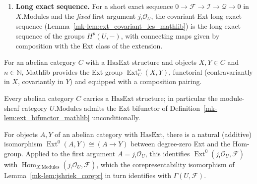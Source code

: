 \begin{definition}
\begin{enumerate}
    \(\operatorname{Ext}^{n+1}(-, \mathcal{I}) = 0\) by
    Lemma~\ref{mk-lem:ext_eq_zero_of_injective_mathlib}. Since \(\mathcal{I}\) is exactly
    the second argument of \(\operatorname{Ext}^{n+1}(j_!\mathcal{O}_U, \mathcal{I})\),
    this yields \(H^{n+1}(U, \mathcal{I}) = 0\) directly: the short exact sequence stays
    in \(X.\mathrm{Modules}\), no restriction is taken, and
    restriction-preserves-injectives is not needed.
  \item \textbf{Long exact sequence.} For a short exact sequence \(0 \to \mathcal{F}
    \to \mathcal{I} \to \mathcal{Q} \to 0\) in \(X.\mathrm{Modules}\) and the
    \emph{fixed} first argument \(j_!\mathcal{O}_U\), the covariant Ext long exact
    sequence (Lemma~\ref{mk-lem:ext_covariant_les_mathlib}) is the long exact sequence of
    the groups \(H^p(U, -)\), with connecting maps given by composition with the Ext
    class of the extension.
  \end{enumerate}
\end{definition}

\begin{definition}
  \label{mk-lem:ext_bifunctor_mathlib}
  \mathlibok

  For an abelian category \(C\) with a \(\mathrm{HasExt}\) structure and objects \(X, Y
  \in C\) and \(n \in \mathbb{N}\), Mathlib provides the Ext group
  \(\operatorname{Ext}^n_C(X, Y)\), functorial (contravariantly in \(X\), covariantly in
  \(Y\)) and equipped with a composition pairing.
\end{definition}

\begin{lemma}
  \label{mk-lem:hasext_standard_mathlib}
  \mathlibok

  Every abelian category \(C\) carries a \(\mathrm{HasExt}\) structure; in particular the
  module-sheaf category \(U.\mathrm{Modules}\) admits the Ext bifunctor of
  Definition~\ref{mk-lem:ext_bifunctor_mathlib} unconditionally.
\end{lemma}

\begin{lemma}
  \label{mk-lem:ext_homequiv_zero_mathlib}
  \mathlibok

  For objects \(A, Y\) of an abelian category with \(\mathrm{HasExt}\), there is a
  natural (additive) isomorphism \(\operatorname{Ext}^0(A, Y) \cong (A \to Y)\) between
  degree-zero Ext and the Hom-group. Applied to the first argument \(A =
  j_!\mathcal{O}_U\), this identifies \(\operatorname{Ext}^0(j_!\mathcal{O}_U,
  \mathcal{F})\) with
  \(\operatorname{Hom}_{X.\mathrm{Modules}}(j_!\mathcal{O}_U, \mathcal{F})\), which the
  corepresentability isomorphism of Lemma~\ref{mk-lem:jshriek_corepr} in turn identifies
  with \(\Gamma(U, \mathcal{F})\).
\end{lemma}

